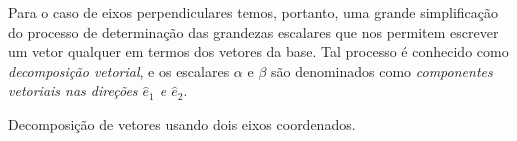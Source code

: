 Para o caso de eixos perpendiculares temos, portanto, uma grande simplificação do processo de determinação das grandezas escalares que nos permitem escrever um vetor qualquer em termos dos vetores da base. Tal processo é conhecido como \emph{decomposição vetorial}, e os escalares $\alpha$ e $\beta$ são denominados como \emph{componentes vetoriais nas direções $\hat{e}_1$ e $\hat{e}_2$}.

\begin{marginfigure}[-6cm]
\centering
{}
\caption{Decomposição de vetores usando dois eixos coordenados.}
\end{marginfigure}

